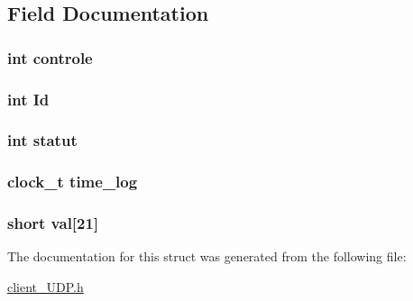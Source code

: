 \subsection{Field Documentation}
\hypertarget{struct_u_d_p__data_a7d35c5e34b4e8dc38e1d4ad1fadbfd08}{
\subsubsection[{controle}]{\setlength{\rightskip}{0pt plus 5cm}int controle}}\label{struct_u_d_p__data_a7d35c5e34b4e8dc38e1d4ad1fadbfd08}
\hypertarget{struct_u_d_p__data_afe0b47b3c92f2f69ea3da50cb72553eb}{
\subsubsection[{Id}]{\setlength{\rightskip}{0pt plus 5cm}int Id}}\label{struct_u_d_p__data_afe0b47b3c92f2f69ea3da50cb72553eb}
\hypertarget{struct_u_d_p__data_ae6fda912a1fbaaf454b35f51919e824a}{
\subsubsection[{statut}]{\setlength{\rightskip}{0pt plus 5cm}int statut}}\label{struct_u_d_p__data_ae6fda912a1fbaaf454b35f51919e824a}
\hypertarget{struct_u_d_p__data_a3a0cad28322d56489bce6f3841dadc10}{
\subsubsection[{time\-\_\-log}]{\setlength{\rightskip}{0pt plus 5cm}clock\-\_\-t time\-\_\-log}}\label{struct_u_d_p__data_a3a0cad28322d56489bce6f3841dadc10}
\hypertarget{struct_u_d_p__data_a6549447b79ab965663c733c54fde16a6}{
\subsubsection[{val}]{\setlength{\rightskip}{0pt plus 5cm}short val\mbox{[}21\mbox{]}}}\label{struct_u_d_p__data_a6549447b79ab965663c733c54fde16a6}


The documentation for this struct was generated from the following file\-:\begin{DoxyCompactItemize}
\item 
\hyperlink{client___u_d_p_8h}{client\-\_\-\-U\-D\-P.\-h}\end{DoxyCompactItemize}
